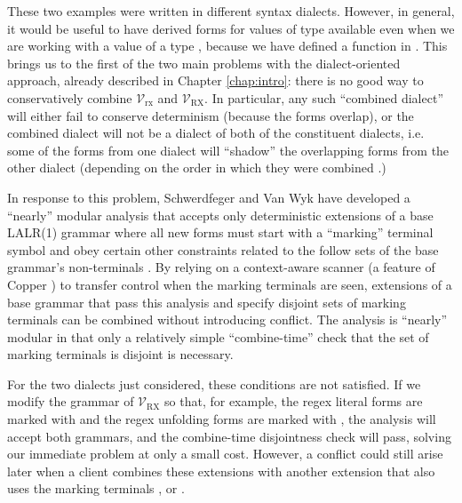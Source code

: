 {These two examples were written in different syntax dialects. However, in general, it would be useful to have derived forms for values of type  available even when we are working with a value of a type , because we have defined a function  in . This brings us to the first of the two main problems with the dialect-oriented approach, already described in Chapter \ref{chap:intro}: there is no good way to conservatively combine $\mathcal{V}_\text{rx}$ and $\mathcal{V}_\text{RX}$. In particular, any such ``combined dialect'' will either fail to conserve determinism (because the forms overlap), or the combined dialect will not be a dialect of both of the constituent dialects, i.e. some of the forms from one dialect will ``shadow'' the overlapping forms from the other dialect (depending on the order in which they were combined \cite{Ford04a}.) 

In response to this problem, Schwerdfeger and Van Wyk have developed a ``nearly'' modular analysis that accepts only deterministic extensions of a base LALR(1) grammar where all new forms must start with a ``marking'' terminal symbol and obey certain other constraints related to  the follow sets of the base grammar's non-terminals \cite{conf/pldi/SchwerdfegerW09}. By relying on a context-aware scanner (a feature of Copper \cite{conf/gpce/WykS07}) to transfer control when the marking terminals are seen, extensions of a base grammar that pass this analysis and specify disjoint sets of marking terminals can be combined without introducing conflict. The analysis is ``nearly'' modular in that only a relatively simple ``combine-time'' check that the set of marking terminals is disjoint is necessary.

For the two dialects just considered, these conditions are not satisfied. If we modify the grammar of $\mathcal{V}_\text{RX}$ so that, for example, the regex literal forms are marked with  and the regex unfolding forms are marked with , the analysis will accept both grammars, and the combine-time disjointness check will pass, solving our immediate problem at only a small cost. However, a conflict could still  arise later when a client combines these extensions with another extension that also uses the marking terminals ,  or \li{/}. %

}
